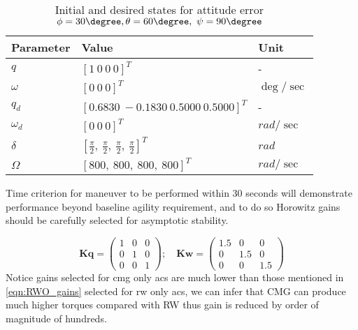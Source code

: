 \begin{table}[!h]
        \centering
        
\begin{tabular}{p{}|p{}|p{}}
\toprule
 Parameter & Value & Unit \\
\midrule
 $\displaystyle q$ & $\displaystyle [ 1\ 0\ 0\ 0]^{T}$ & - \\
\hline 
 $\displaystyle \omega $ & $\displaystyle [ 0\ 0\ 0]^{T}$ & $\displaystyle \deg /\sec$ \\
\hline 
 $\displaystyle q_{d}$ & $\displaystyle [ 0.6830\ -0.1830\ 0.5000\ 0.5000]^{T}$ & - \\
\hline 
 $\displaystyle \omega _{d}$ & $\displaystyle [ 0\ 0\ 0]^{T}$ & $\displaystyle rad/\sec$ \\
\hline 
 $\displaystyle \delta $ & $\displaystyle \left[\frac{\pi }{2} ,\ \frac{\pi }{2} ,\ \frac{\pi }{2} ,\ \frac{\pi }{2}\right]^{T}$ & $\displaystyle rad$ \\
\hline 
 $\displaystyle \Omega $ & $\displaystyle [ 800,\ 800,\ 800,\ 800]^{T}$ & $\displaystyle rad/\sec$ \\
 \bottomrule
\end{tabular}
        \caption{Initial and desired states for attitude error $\displaystyle \phi =30\degree ,\theta =60\degree ,\ \psi =90\degree $}
\label{tbl:rr_ypr306090}
\end{table}
\noindent Time criterion for maneuver to be performed within 30 seconds will demonstrate performance beyond baseline agility requirement, and to do so Horowitz gains should be carefully selected for asymptotic stability. 


\begin{equation}
\mathbf{Kq} =\begin{pmatrix}
1 & 0 & 0\\
0 & 1 & 0\\
0 & 0 & 1
\end{pmatrix} ;\quad \mathbf{Kw} =\begin{pmatrix}
1.5 & 0 & 0\\
0 & 1.5 & 0\\
0 & 0 & 1.5
\end{pmatrix}
\label{eqn:CMO_gains}
\end{equation}
Notice gains selected for \acrshort{cmg} only \acrshort{acs} are much lower than those mentioned in \autoref{eqn:RWO_gains} selected for \acrshort{rw}  only \acrshort{acs}, we can infer that CMG can produce much higher torques compared with RW thus gain is reduced by order of magnitude of hundreds.

